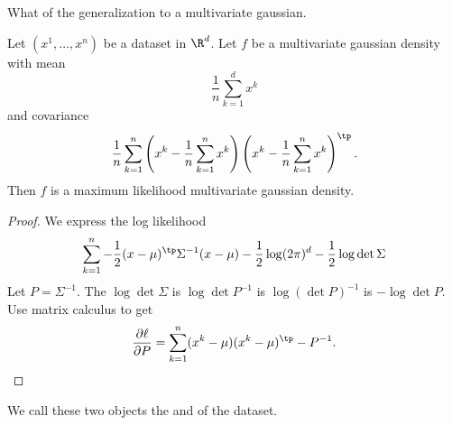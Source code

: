 
\sbasic



















































\sstart
{}


What of the generalization to a multivariate gaussian.


\begin{prop}
Let $(x^1, \dots, x^n)$ be a dataset in $\R^d$.
Let $f$ be a multivariate gaussian density with
mean
\[
  \frac{1}{n} \sum_{k = 1}^{d} x^k
\]
and covariance
\[
  \frac{1}{n}
  \sum_{k = 1}^{n}
  \left(x^k - \frac{1}{n} \sum_{k = 1}^{n} x^k\right)
  \left(x^k - \frac{1}{n} \sum_{k = 1}^{n} x^k\right)^\tp
  .
\]
Then $f$ is a maximum likelihood multivariate gaussian
density.
\begin{proof}
  We express the log likelihood
  \[
    \sum_{k = 1}^{n} -\frac{1}{2}(x - \mu)^\tp \Sigma^{-1} (x-\mu) - \frac{1}{2}\log (2\pi)^d - \frac{1}{2} \log \det \Sigma
  \]
  Let $P = \Sigma^{-1}$. The $\log\det \Sigma$ is $\log\det P^{-1}$ is $\log \left(\det P\right)^{-1}$ is $- \log\det P$.
  Use matrix calculus to get
  \[
    \frac{\partial \ell}{\partial P} = \sum_{k = 1}^{n} (x^k - \mu)(x^k - \mu)^\tp - P^{-1}.
  \]
\end{proof}
\end{prop}
We call these two objects
the 
and 
of the dataset.
\strats
